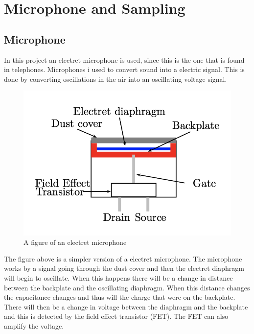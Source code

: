 \chapter{Microphone and Sampling}


\section{Microphone}
In this project an electret microphone is used, since this is the one that is found in telephones. 
Microphones i used to convert sound into a electric signal. This is done by converting oscillations in the air into an oscillating voltage signal. 

\begin{figure}[H]
    \centering
    \includegraphics[scale=0.65]{figures/Microphone_figure.png}
    \caption{A figure of an electret microphone \cite[p. 160]{LectureNotes}}
    \label{fig:mic_figure}
\end{figure}

The figure above is a simpler version of a electret microphone. The microphone works by a signal going through the dust cover and then the electret diaphragm will begin to oscillate. When this happens there will be a change in distance between the backplate and the oscillating diaphragm. When this distance changes the capacitance changes and thus will the charge that were on the backplate. There will then be a change in voltage between the diaphragm and the backplate and this is detected by the field effect transistor (FET). The FET can also amplify the voltage. \\


